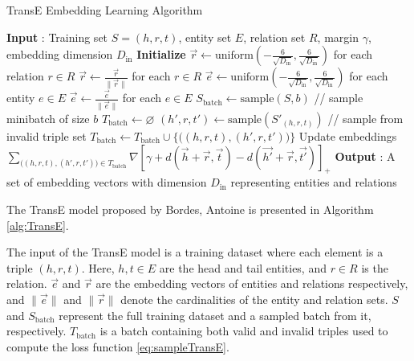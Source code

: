 \begin{algorithm}
	\caption{TransE Embedding Learning Algorithm \protect\cite{bordes2013translating}}\label{alg:TransE}
	\begin{algorithmic}[1]
		\Statex \textbf{Input} :
		Training set $S = {(h, r, t)}$, entity set $E$, relation set $R$, margin $\gamma$, embedding dimension $D_{\text{in}}$	
		\Statex \textbf{Initialize}
		\State $\overrightarrow{r} \leftarrow \text{uniform}(-\frac{6}{\sqrt{D_{\text{in}}}}, \frac{6}{\sqrt{D_{\text{in}}}})$ for each relation $r \in R$
		\State $\overrightarrow{r} \leftarrow \frac{\overrightarrow{r}}{\|\overrightarrow{r}\|}$ for each $r \in R$
		\State $\overrightarrow{e} \leftarrow \text{uniform}(-\frac{6}{\sqrt{D_{\text{in}}}}, \frac{6}{\sqrt{D_{\text{in}}}})$ for each entity $e \in E$
		\Loop
		\State $\overrightarrow{e} \leftarrow \frac{\overrightarrow{e}}{\|\overrightarrow{e}\|}$ for each $e \in E$
		\State $S_{\text{batch}} \leftarrow \text{sample}(S, b)$  // sample minibatch of size $b$
		\State $T_{\text{batch}} \leftarrow \varnothing $
		\State $(h', r, t') \leftarrow \text{sample}(S'_{(h, r, t)})$ // sample from invalid triple set
		\State $T_{\text{batch}} \leftarrow T_{\text{batch}} \cup \Big\{ \Big( (h, r, t), (h', r, t') \Big) \Big\}$
		\EndFor
		\Statex Update embeddings
		\State $\sum_{\Big( (h, r, t), (h', r, t')\Big) \in T_{\text{batch}}} \nabla [\gamma + d(\overrightarrow{h} + \overrightarrow{r}, \overrightarrow{t}) - d(\overrightarrow{h'} + \overrightarrow{r}, \overrightarrow{t'})]_{+}$
		\EndLoop
		\Statex \textbf{Output} :
		A set of embedding vectors with dimension $D_{\text{in}}$ representing entities and relations
	\end{algorithmic}
\end{algorithm}

The TransE model proposed by Bordes, Antoine \cite{bordes2013translating} is presented in Algorithm \ref{alg:TransE}.


The input of the TransE model is a training dataset where each element is a triple $(h, r, t)$. Here, $h, t \in E$ are the head and tail entities, and $r \in R$ is the relation. $\overrightarrow{e}$ and $\overrightarrow{r}$ are the embedding vectors of entities and relations respectively, and $\|\overrightarrow{e}\|$ and $\|\overrightarrow{r}\|$ denote the cardinalities of the entity and relation sets. $S$ and $S_{\text{batch}}$ represent the full training dataset and a sampled batch from it, respectively. $T_{\text{batch}}$ is a batch containing both valid and invalid triples used to compute the loss function \ref{eq:sampleTransE}.

